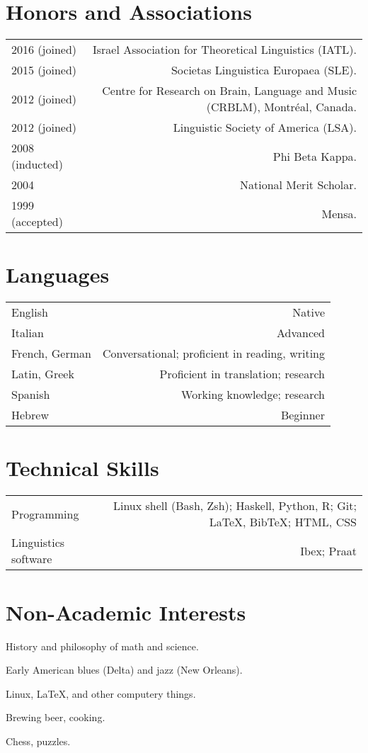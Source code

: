 \documentclass[11pt,a4paper,twoside]{article}
\makeatletter
\newenvironment{cvsection}{%
  \setlength{\extrarowheight}{0.70ex}
  \begin{longtable}[l]{@{} L R @{}}
}{%
  \end{longtable}
}
\makeatother
\begin{document}
\section*{Honors and Associations}

\begin{cvsection}
  2016 {\footnotesize (joined)} & Israel Association for Theoretical Linguistics (IATL).\\
  2015 {\footnotesize (joined)} & Societas Linguistica Europaea (SLE).\\
  2012 {\footnotesize (joined)} & Centre for Research on Brain, Language and Music (CRBLM), Montr\'{e}al, Canada.\\
  2012 {\footnotesize (joined)} & Linguistic Society of America (LSA).\\
  2008 {\footnotesize (inducted)} & Phi Beta Kappa.\\
  2004 & National Merit Scholar.\\
  1999 {\footnotesize (accepted)} & Mensa.\\
\end{cvsection}

\section*{Languages}

\begin{cvsection}
  English & Native\\
  Italian & Advanced\\
  French, German & Conversational; proficient in reading, writing\\
  Latin, Greek & Proficient in translation; research\\
  Spanish & Working knowledge; research\\
  Hebrew & Beginner\\
\end{cvsection}

\section*{Technical Skills}

\begin{cvsection}
  Programming & Linux shell (Bash, Zsh); Haskell, Python, R; Git; \LaTeX, Bib\TeX; HTML, CSS\\
  Linguistics software & Ibex; Praat\\
\end{cvsection}

\section*{Non-Academic Interests}

\begin{list}{}{\leftmargin=0pt}
  \item History and philosophy of math and science.
  \item Early American blues (Delta) and jazz (New Orleans).
  \item Linux, \LaTeX{}, and other computery things.
  \item Brewing beer, cooking.
  \item Chess, puzzles.
\end{list}
\end{document}
